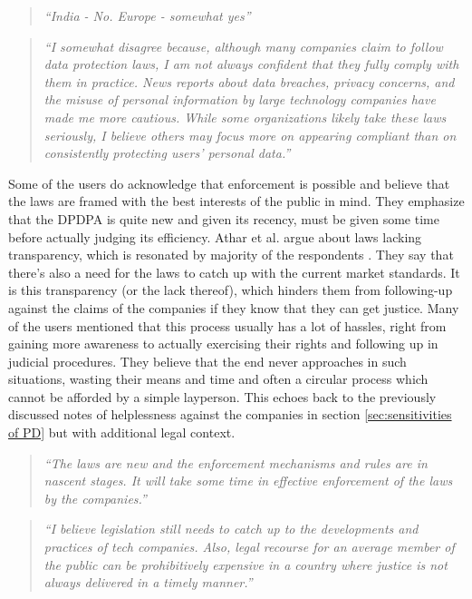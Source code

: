 \begin{quote}
    \textit{``India - No. Europe - somewhat yes''}
\end{quote}    
\begin{quote}
    \textit{``I somewhat disagree because, although many companies claim to follow data protection laws, I am not always confident that they fully comply with them in practice. News reports about data breaches, privacy concerns, and the misuse of personal information by large technology companies have made me more cautious. While some organizations likely take these laws seriously, I believe others may focus more on appearing compliant than on consistently protecting users’ personal data.''}
\end{quote}

Some of the users do acknowledge that enforcement is possible and believe that the laws are framed with the best interests of the public in mind. They emphasize that the DPDPA is quite new and given its recency, must be given some time before actually judging its efficiency. Athar et al. argue about laws lacking transparency, which is resonated by majority of the respondents \cite{athar2026}. They say that there's also a need for the laws to catch up with the current market standards. It is this transparency (or the lack thereof), which hinders them from following-up against the claims of the companies if they know that they can get justice. Many of the users mentioned that this process usually has a lot of hassles, right from gaining more awareness to actually exercising their rights and following up in judicial procedures. They believe that the end never approaches in such situations, wasting their means and time and often a circular process which cannot be afforded by a simple layperson. This echoes back to the previously discussed notes of helplessness against the companies in section \ref{sec:sensitivities of PD} but with additional legal context.

\begin{quote}
     \textit{``The laws are new and the enforcement mechanisms and rules are in nascent stages. It will take some time in effective enforcement of the laws by the companies.''}   
\end{quote}     

\begin{quote}
     \textit{``I believe legislation still needs to catch up to the developments and practices of tech companies. Also, legal recourse for an average member of the public can be prohibitively expensive in a country where justice is not always delivered in a timely manner.''}
\end{quote}

